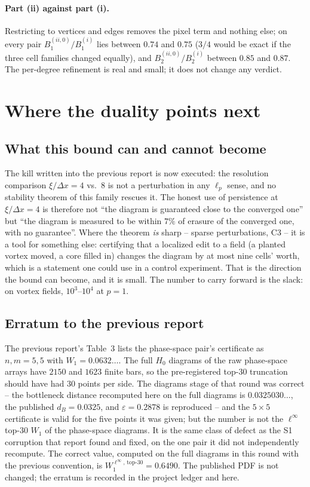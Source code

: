 \documentclass[11pt,a4paper]{article}
\newcommand{\dB}{d_{B}}
\newcommand{\phaseprev}{0.6490}
\begin{document}
\paragraph{Part (ii) against part (i).} Restricting to vertices and edges removes the pixel term
and nothing else; on every pair $B^{(ii,0)}_1/B^{(i)}_1$ lies between $0.74$ and $0.75$ ($3/4$ would
be exact if the three cell families changed equally), and $B^{(ii,0)}_2/B^{(i)}_2$ between $0.85$ and $0.87$. The
per-degree refinement is real and small; it does not change any verdict.

\section{Where the duality points next}
\label{sec:directions}

\subsection{What this bound can and cannot become}

The kill written into the previous report is now executed: the resolution comparison
$\xi/\Delta x=4$ vs.\ $8$ is not a perturbation in any $\ell_p$ sense, and no stability theorem of
this family rescues it. The honest use of persistence at $\xi/\Delta x=4$ is therefore not ``the
diagram is guaranteed close to the converged one'' but ``the diagram is measured to be within $7\%$
of erasure of the converged one, with no guarantee''. Where the theorem \emph{is} sharp -- sparse
perturbations, C3 -- it is a tool for something else: certifying that a localized edit to a field
(a planted vortex moved, a core filled in) changes the diagram by at most nine cells' worth, which is
a statement one could use in a control experiment. That is the direction the bound can become, and it
is small. The number to carry forward is the slack: on vortex fields, $10^3$--$10^4$ at $p=1$.

\subsection{Erratum to the previous report}
\label{sec:erratum}

The previous report's Table~3 lists the phase-space pair's certificate as $n,m=5,5$ with
$W_1=0.0632\ldots$. The full $H_0$ diagrams of the raw phase-space arrays have $2150$ and $1623$
finite bars, so the pre-registered top-30 truncation should have had 30 points per side. The
diagrams stage of that round was correct -- the bottleneck distance recomputed here on the full
diagrams is $0.0325030\ldots$, the published $\dB=0.0325$, and $\varepsilon=0.2878$ is reproduced --
and the $5\times5$ certificate is valid for the five points it was given; but the number is not the
$\ell^\infty$ top-30 $W_1$ of the phase-space diagrams. It is the same class of defect as the S1
corruption that report found and fixed, on the one pair it did not independently recompute. The
correct value, computed on the full diagrams in this round with the previous convention, is
$W_1^{\ell^\infty,\,\mathrm{top}\text{-}30}=\phaseprev$. The published PDF is not changed; the
erratum is recorded in the project ledger and here.
\end{document}
